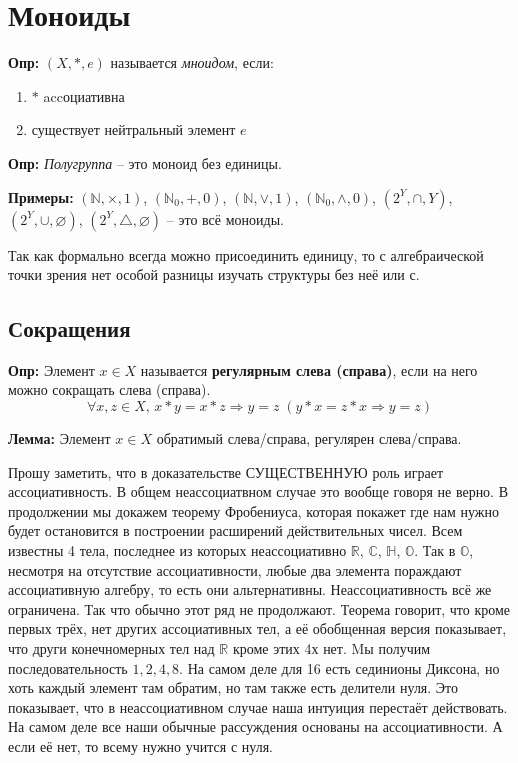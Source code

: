 \section{Моноиды}
\textbf{Опр:} $(X,*,e)$ называется \emph{мноидом}, если:
\begin{enumerate}
    \item $*$ accоциативна
    \item существует нейтральный элемент $e$
\end{enumerate}

\textbf{Опр:} \emph{Полугруппа} – это моноид без единицы.

\textbf{Примеры:}
$(\mathbb{N},\times,1)$, $(\mathbb{N}_0,+,0)$, $(\mathbb{N},\vee,1)$,
$(\mathbb{N}_0, \wedge, 0)$, $(2^Y,\cap,Y)$, $(2^Y,\cup,\varnothing)$,
$(2^Y,\triangle,\varnothing)$ – это всё моноиды.

Так как формально всегда можно присоединить единицу, то с алгебраической точки
зрения нет особой разницы изучать структуры без неё или с.

\subsection{Сокращения}
\textbf{Опр:} Элемент $x\in X$ называется \textbf{регулярным слева (справа)},
если на него можно сокращать слева (справа).
\[\forall x,z\in X,\, x*y=x*z\Rightarrow y=z\;(y*x=z*x\Rightarrow y=z)\]

\textbf{Лемма:} Элемент $x\in X$ обратимый слева/справа, регулярен слева/справа.

Прошу заметить, что в доказательстве СУЩЕСТВЕННУЮ роль играет ассоциативность.
В общем неассоциатвном случае это вообще говоря не верно. В продолжении мы
докажем теорему Фробениуса, которая покажет где нам нужно будет остановится в
построении расширений действительных чисел. Всем известны 4 тела, последнее из
которых неассоциативно $\mathbb{R}$, $\mathbb{C}$, $\mathbb{H}$, $\mathbb{O}$.
Так в $\mathbb{O}$, несмотря на отсутствие ассоциативности, любые два элемента
пораждают ассоциативную алгебру, то есть они альтернативны. Неассоциативность
всё же ограничена. Так что обычно этот ряд не продолжают. Теорема говорит, что
кроме первых трёх, нет других ассоциативных тел, а её обобщенная версия
показывает, что други конечномерных тел над $\mathbb{R}$ кроме этих 4х нет. Mы
получим последовательность $1,2,4,8$. На самом деле для 16 есть сединионы
Диксона, но хоть каждый элемент там обратим, но там также есть делители нуля.
Это показывает, что в неассоциативном случае наша интуиция перестаёт действовать.
На самом деле все наши обычные рассуждения основаны на ассоциативности. А если
её нет, то всему нужно учится с нуля.

